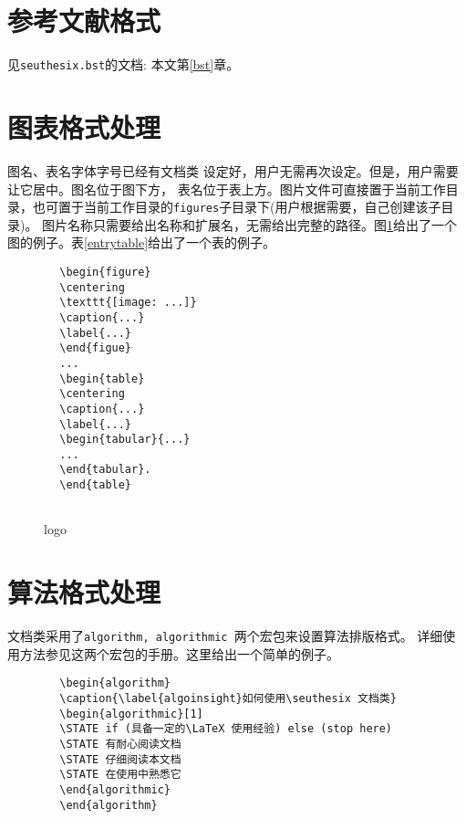 \documentclass[figurelist,tablelist,algorithmlist,nomlist,masters]{seuthesix}
\begin{document}
	\section{参考文献格式}
	见\verb+seuthesix.bst+的文档: 本文第\ref{bst}章。
	
	\section{图表格式处理}
	图名、表名字体字号已经有文档类 设定好，用户无需再次设定。但是，用户需要让它居中。图名位于图下方，
	表名位于表上方。图片文件可直接置于当前工作目录，也可置于当前工作目录的\texttt{figures}子目录下(用户根据需要，自己创建该子目录)。
	图片名称只需要给出名称和扩展名，无需给出完整的路径。图\ref{logo}给出了一个图的例子。表\ref{entrytable}给出了一个表的例子。
	{\color{magenta}
		\begin{verbatim}
		\begin{figure}
		\centering
		\texttt{[image: ...]}
		\caption{...}
		\label{...}
		\end{figue}
		...
		\begin{table}
		\centering
		\caption{...}
		\label{...}
		\begin{tabular}{...}
		...
		\end{tabular}.
		\end{table}
		
		\end{verbatim}
	}
	
	\begin{figure}
	\centering
	\caption{\seuthesix logo\label{logo}}
	\chuhao \seuthesix
	\end{figure}
	
	\section{算法格式处理}
	\seuthesix 文档类采用了\texttt{algorithm, algorithmic }两个宏包来设置算法排版格式。
	详细使用方法参见这两个宏包的手册。这里给出一个简单的例子。
	{\color{magenta}
		\begin{verbatim}
		\begin{algorithm}
		\caption{\label{algoinsight}如何使用\seuthesix 文档类}
		\begin{algorithmic}[1]
		\STATE if (具备一定的\LaTeX 使用经验) else (stop here)
		\STATE 有耐心阅读文档
		\STATE 仔细阅读本文档
		\STATE 在使用中熟悉它
		\end{algorithmic}
		\end{algorithm}
		\end{verbatim}
	}
	
\end{document}
